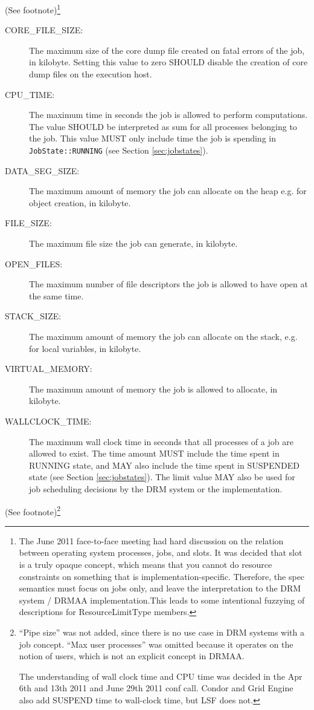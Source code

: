 \documentclass{article}
\newcommand{\h}[1]{\lstinline|#1|}
\newcommand{\rat}[1]{ {\tiny(See footnote)}\footnote{#1} }
\begin{document}
\rat{
The June 2011 face-to-face meeting had hard discussion on the relation between operating system processes, jobs, and slots. It was decided that slot is a truly opaque concept, which means that you cannot do resource constraints on something that is implementation-specific. Therefore, the spec semantics must focus on jobs only, and leave the interpretation to the DRM system / DRMAA implementation.This leads to some intentional fuzzying of descriptions for ResourceLimitType members.
}



\begin{description}
\item[CORE\_FILE\_SIZE:] The maximum size of the core dump file created on fatal errors of the job, in kilobyte. Setting this value to zero SHOULD disable the creation of core dump files on the execution host. 
 \item[CPU\_TIME:] The maximum time in seconds the job is allowed to perform computations. The value SHOULD be interpreted as sum for all processes belonging to the job. This value MUST only include time the job is spending in \h{JobState::RUNNING} (see Section \ref{sec:jobstates}).  
\item[DATA\_SEG\_SIZE:] The maximum amount of memory the job can allocate on the heap e.g. for object creation, in kilobyte.
\item[FILE\_SIZE:] The maximum file size the job can generate, in kilobyte.
\item[OPEN\_FILES:] The maximum number of file descriptors the job is allowed to have open at the same time.
\item[STACK\_SIZE:] The maximum amount of memory the job can allocate on the stack, e.g. for local variables,  in kilobyte.
\item[VIRTUAL\_MEMORY:] The maximum amount of memory the job is allowed to allocate, in kilobyte.  
\item[WALLCLOCK\_TIME:] The maximum wall clock time in seconds that all processes of a job are allowed to exist. The time amount MUST include the time spent in RUNNING state, and MAY also include the time spent in SUSPENDED state (see Section \ref{sec:jobstates}). The limit value MAY also be used for job scheduling decisions by the DRM system or the implementation.
\end{description}

\rat{
\enquote{Pipe size} was not added, since there is no use case in DRM systems with a job concept. \enquote{Max user processes} was omitted because it operates on the notion of users, which is not an explicit concept in DRMAA.

The understanding of wall clock time and CPU time was decided in the Apr 6th and 13th 2011 and June 29th 2011 conf call. Condor and Grid Engine also add SUSPEND time to wall-clock time, but LSF does not.
}
\end{document}
